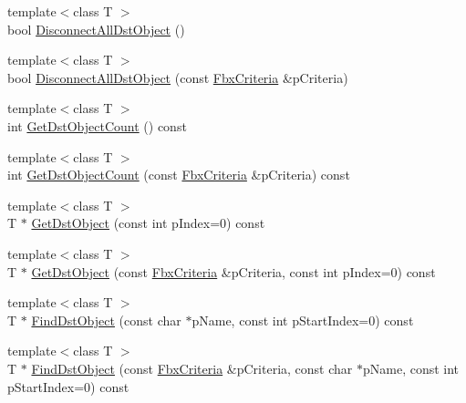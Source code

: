 \begin{DoxyCompactItemize}
{\footnotesize template$<$class T $>$ }\\bool \hyperlink{class_fbx_property_a9700052b15311bdbdb950fec91fe8ea8}{Disconnect\+All\+Dst\+Object} ()
\item 
{\footnotesize template$<$class T $>$ }\\bool \hyperlink{class_fbx_property_aa87d6cc464919a95dd7fd428b28c6e48}{Disconnect\+All\+Dst\+Object} (const \hyperlink{class_fbx_criteria}{Fbx\+Criteria} \&p\+Criteria)
\item 
{\footnotesize template$<$class T $>$ }\\int \hyperlink{class_fbx_property_a99dd8bf0103c66a7a8bf3a5ea72e41bd}{Get\+Dst\+Object\+Count} () const
\item 
{\footnotesize template$<$class T $>$ }\\int \hyperlink{class_fbx_property_a5ba90af060ad449844816a3234ad0750}{Get\+Dst\+Object\+Count} (const \hyperlink{class_fbx_criteria}{Fbx\+Criteria} \&p\+Criteria) const
\item 
{\footnotesize template$<$class T $>$ }\\T $\ast$ \hyperlink{class_fbx_property_a97b492c1eb439a481dbea8f494b82a2e}{Get\+Dst\+Object} (const int p\+Index=0) const
\item 
{\footnotesize template$<$class T $>$ }\\T $\ast$ \hyperlink{class_fbx_property_af7d61576c53b6b0d1dbf0f0d0a27ad3d}{Get\+Dst\+Object} (const \hyperlink{class_fbx_criteria}{Fbx\+Criteria} \&p\+Criteria, const int p\+Index=0) const
\item 
{\footnotesize template$<$class T $>$ }\\T $\ast$ \hyperlink{class_fbx_property_ab4b1b4ad00991bfbd702d8ea2bde5ae7}{Find\+Dst\+Object} (const char $\ast$p\+Name, const int p\+Start\+Index=0) const
\item 
{\footnotesize template$<$class T $>$ }\\T $\ast$ \hyperlink{class_fbx_property_a76ea2989d26c3e48488b4edb88d79ddb}{Find\+Dst\+Object} (const \hyperlink{class_fbx_criteria}{Fbx\+Criteria} \&p\+Criteria, const char $\ast$p\+Name, const int p\+Start\+Index=0) const
\end{DoxyCompactItemize}
